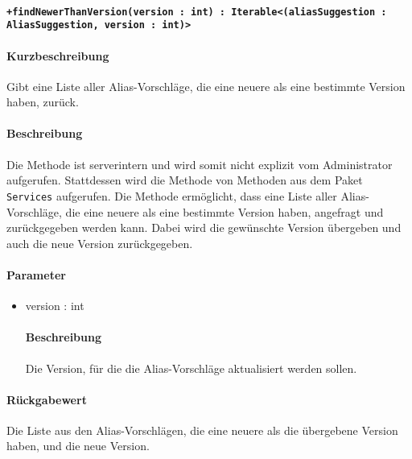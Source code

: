 \paragraph*{\texttt{+findNewerThanVersion(version : int) : Iterable<(aliasSuggestion : AliasSuggestion, version : int)>}}%
\paragraph*{Kurzbeschreibung}
Gibt eine Liste aller Alias-Vorschläge, die eine neuere als eine bestimmte Version haben, zurück.
\paragraph*{Beschreibung}
Die Methode ist serverintern und wird somit nicht explizit vom Administrator aufgerufen.
Stattdessen wird die Methode von Methoden aus dem Paket \texttt{Services} aufgerufen.
Die Methode ermöglicht, dass eine Liste aller Alias-Vorschläge, die eine neuere als eine bestimmte Version haben, angefragt und zurückgegeben werden kann.
Dabei wird die gewünschte Version übergeben und auch die neue Version zurückgegeben.
\paragraph*{Parameter}
\begin{itemize}
    \item version : int
    		\paragraph*{Beschreibung}
    		Die Version, für die die Alias-Vorschläge aktualisiert werden sollen.
\end{itemize}
\paragraph*{Rückgabewert}
Die Liste aus den Alias-Vorschlägen, die eine neuere als die übergebene Version haben, und die neue Version.
